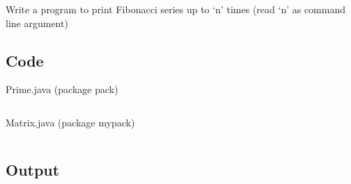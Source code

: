 \documentclass[../main.tex]{subfiles}
\begin{document}
Write a program to print Fibonacci series up to ‘n’ times (read ‘n’ as command line argument)

\subsection{Code}
Prime.java (package pack)
\inputminted[frame=lines, breaklines, breakanywhere, numberblanklines=false]{java}{./programs/prog3/pack/Prime.java}
Matrix.java (package mypack)
\inputminted[frame=lines, breaklines, breakanywhere, numberblanklines=false]{java}{./programs/prog3/mypack/Matrix.java}

\subsection{Output}
\end{document}
